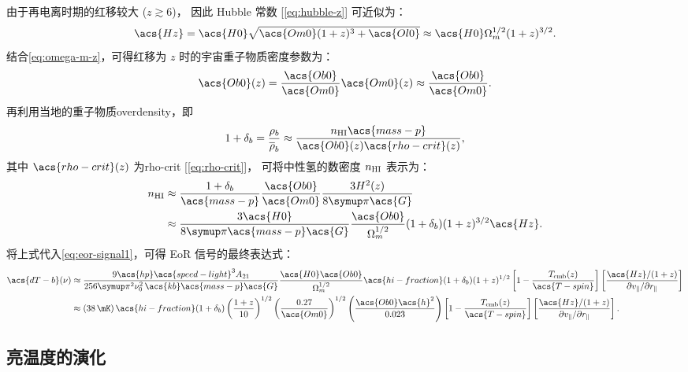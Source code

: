 由于再电离时期的红移较大 ($z \gtrsim 6$)，
因此 Hubble 常数 [\autoref{eq:hubble-z}] 可近似为：
\begin{equation}
  \acs{Hz} = \acs{H0} \sqrt{\acs{Om0} (1+z)^3 + \acs{Ol0}}
    \approx \acs{H0} \Omega_m^{1/2} (1+z)^{3/2} .
\end{equation}
结合\autoref{eq:omega-m-z}，可得红移为 $z$ 时的宇宙重子物质密度参数为：
\begin{equation}
  \acs{Ob0}(z) = \frac{\acs{Ob0}}{\acs{Om0}} \acs{Om0}(z)
    \approx \frac{\acs{Ob0}}{\acs{Om0}} .
\end{equation}
再利用当地的重子物质\ac{overdensity}，即
\begin{equation}
  1 + \delta_b = \frac{\rho_b}{\overline{\rho}_b}
    \approx \frac{n_{\R{HI}} \acs{mass-p}}{\acs{Ob0}(z) \acs{rho-crit}(z)} ,
\end{equation}
其中 $\acs{rho-crit}(z)$ 为\acl{rho-crit} [\autoref{eq:rho-crit}]，
可将中性氢的数密度 $n_{\mathrm{HI}}$ 表示为：
\begin{align}
  n_{\R{HI}}
    & \approx \frac{1+\delta_b}{\acs{mass-p}} \frac{\acs{Ob0}}{\acs{Om0}}
      \frac{3 H^2(z)}{8 \Cpi \acs{G}}  \\
    & \approx \frac{3 \acs{H0}}{8\Cpi\acs{mass-p}\acs{G}}
      \frac{\acs{Ob0}}{\Omega_m^{1/2}} (1+\delta_b) (1+z)^{3/2} \acs{Hz} .
\end{align}
将上式代入\autoref{eq:eor-signal1}，可得 EoR 信号的最终表达式：
\begin{align}
  \acs{dT-b}(\nu)
    & \approx \frac{9 \acs{hp} \acs{speed-light}^3 A_{21}}{
      256\Cpi^2 \nu_0^2 \,\acs{kb} \acs{mass-p} \acs{G}}
      \frac{\acs{H0} \acs{Ob0}}{\Omega_m^{1/2}}
      \acs{hi-fraction} (1+\delta_b) (1+z)^{1/2}
      \left[ 1 - \frac{T_{\R{cmb}}(z)}{\acs{T-spin}} \right]
      \left[ \frac{\acs{Hz} / (1+z)}{
        \partial v_{\parallel} / \partial r_{\parallel}} \right]
  \label{eq:eor-signal2}  \\
    & \approx \left( \SI{38}{\mK} \right)
      \acs{hi-fraction} (1+\delta_b)
      \left( \frac{1+z}{10} \right)^{1/2}
      \left( \frac{0.27}{\acs{Om0}} \right)^{1/2}
      \left( \frac{\acs{Ob0} \acs{h}^2}{0.023} \right)
      \left[ 1 - \frac{T_{\R{cmb}}(z)}{\acs{T-spin}} \right]
      \left[ \frac{\acs{Hz} / (1+z)}{
        \partial v_{\parallel} / \partial r_{\parallel}} \right] .
  \label{eq:eor-signal3}
\end{align}

\subsection{亮温度的演化}

